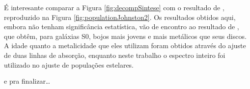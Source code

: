 É interesante comparar a Figura \ref{fig:decompSintese} com o resultado de
\citet{Johnston2012}, reproduzido na Figura \ref{fig:populationJohnston2}.
Os resultados obtidos aqui, embora não tenham significância estatística, vão de
encontro ao resultado de \citeauthor{Johnston2012}, que obtêm, para galáxias S0,
bojos mais jovens e mais metálicos que seus discos. A idade quanto a
metalicidade que eles utilizam foram obtidos através do ajuste de duas linhas de
absorção, enquanto neste trabalho o espectro inteiro foi utilizado no ajuste de
populações estelares.

\TODO e pra finalizar\ldots

